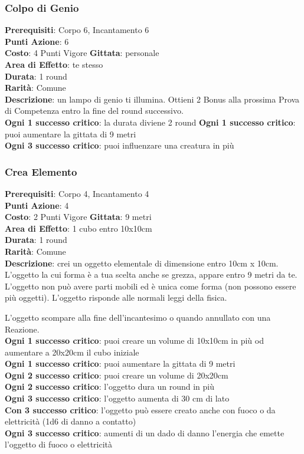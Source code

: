 \documentclass[12pt,a4paper,twoside,openany]{book}
\begin{document}
\begin{multicols}{2}
\subsubsection*{Colpo di Genio}
\textbf{Prerequisiti}: Corpo 6, Incantamento 6\\
\textbf{Punti Azione}: 6\\
\textbf{Costo}: 4 Punti Vigore
\textbf{Gittata}: personale\\
\textbf{Area di Effetto}: te stesso\\
\textbf{Durata}: 1 round\\
\textbf{Rarità}: Comune\\
\textbf{Descrizione}: un lampo di genio ti illumina. 
Ottieni 2 Bonus alla prossima Prova di Competenza entro la fine del round successivo.\\
\textbf{Ogni 1 successo critico}: la durata diviene 2 round
\textbf{Ogni 1 successo critico}: puoi aumentare la gittata di 9 metri\\
\textbf{Ogni 3 successo critico}: puoi influenzare una creatura in più

\subsubsection*{Crea Elemento}
\textbf{Prerequisiti}: Corpo 4, Incantamento 4\\
\textbf{Punti Azione}: 4\\
\textbf{Costo}: 2 Punti Vigore
\textbf{Gittata}: 9 metri\\
\textbf{Area di Effetto}: 1 cubo entro 10x10cm\\
\textbf{Durata}: 1 round\\
\textbf{Rarità}: Comune\\
\textbf{Descrizione}: crei un oggetto elementale di dimensione entro 10cm x 10cm.
L'oggetto la cui forma è a tua scelta anche se grezza, appare entro 9 metri da te. 
L'oggetto non può avere parti mobili ed è unica come forma (non possono essere più oggetti). L'oggetto risponde alle normali leggi della fisica.

L'oggetto scompare alla fine dell'incantesimo o quando annullato con una Reazione.\\
\textbf{Ogni 1 successo critico}: puoi creare un volume di 10x10cm in più od aumentare a 20x20cm il cubo iniziale\\
\textbf{Ogni 1 successo critico}: puoi aumentare la gittata di 9 metri\\
\textbf{Ogni 2 successo critico}: puoi creare un volume di 20x20cm\\
\textbf{Ogni 2 successo critico}: l'oggetto dura un round in più\\
\textbf{Ogni 3 successo critico}: l'oggetto aumenta di 30 cm di lato\\
\textbf{Con 3 successo critico}: l'oggetto può essere creato anche con fuoco o da elettricità (1d6 di danno a contatto)\\
\textbf{Ogni 3 successo critico}: aumenti di un dado di danno l'energia che emette l'oggetto di fuoco o elettricità


\end{multicols}
\end{document}
